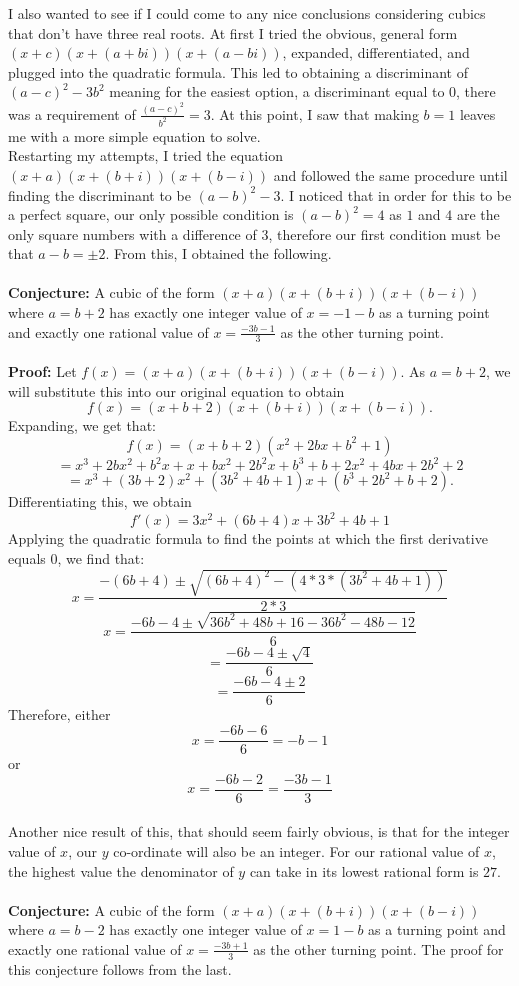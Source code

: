 \documentclass[12pt]{article}
\begin{document}
I also wanted to see if I could come to any nice conclusions considering cubics that don't have three real roots. At first I tried the obvious, general form $(x+c)(x+(a+bi))(x+(a-bi))$, expanded, differentiated, and plugged into the quadratic formula. This led to obtaining a discriminant of $(a-c)^2-3b^2$ meaning for the easiest option, a discriminant equal to $0$, there was a requirement of $\frac{(a-c)^2}{b^2}=3$. At this point, I saw that making $b=1$ leaves me with a more simple equation to solve.\\
Restarting my attempts, I tried the equation $(x+a)(x+(b+i))(x+(b-i))$ and followed the same procedure until finding the discriminant to be $(a-b)^2-3$. I noticed that in order for this to be a perfect square, our only possible condition is $(a-b)^2=4$ as $1$ and $4$ are the only square numbers with a difference of $3$, therefore our first condition must be that $a-b=\pm2$. From this, I obtained the following.\\\\
\textbf{Conjecture:} A cubic of the form $(x+a)(x+(b+i))(x+(b-i))$ where $a=b+2$ has exactly one integer value of $x=-1-b$ as a turning point and exactly one rational value of $x=\frac{-3b-1}{3}$ as the other turning point.\\\\
\textbf{Proof:} Let $f(x)=(x+a)(x+(b+i))(x+(b-i))$. As $a=b+2$, we will substitute this into our original equation to obtain 
$$f(x)=(x+b+2)(x+(b+i))(x+(b-i)).$$
Expanding, we get that:
$$f(x)=(x+b+2)(x^2+2bx+b^2+1)$$
$$=x^3+2bx^2+b^2x+x+bx^2+2b^2x+b^3+b+2x^2+4bx+2b^2+2$$
$$=x^3+(3b+2)x^2+(3b^2+4b+1)x+(b^3+2b^2+b+2).$$
Differentiating this, we obtain
$$f'(x)=3x^2+(6b+4)x+3b^2+4b+1$$
Applying the quadratic formula to find the points at which the first derivative equals $0$, we find that:
$$x=\frac{-(6b+4)\pm\sqrt{(6b+4)^2-(4*3*(3b^2+4b+1))}}{2*3}$$
$$x=\frac{-6b-4\pm\sqrt{36b^2+48b+16-36b^2-48b-12}}{6}$$
$$=\frac{-6b-4\pm\sqrt{4}}{6}$$
$$=\frac{-6b-4\pm2}{6}$$
Therefore, either
$$x=\frac{-6b-6}{6}=-b-1$$ or $$x=\frac{-6b-2}{6}=\frac{-3b-1}{3}$$\\
Another nice result of this, that should seem fairly obvious, is that for the integer value of $x$, our $y$ co-ordinate will also be an integer. For our rational value of $x$, the highest value the denominator of $y$ can take in its lowest rational form is $27$.\\\\

\textbf{Conjecture:} A cubic of the form $(x+a)(x+(b+i))(x+(b-i))$ where $a=b-2$ has exactly one integer value of $x=1-b$ as a turning point and exactly one rational value of $x=\frac{-3b+1}{3}$ as the other turning point. The proof for this conjecture follows from the last.\\\\
\end{document}
